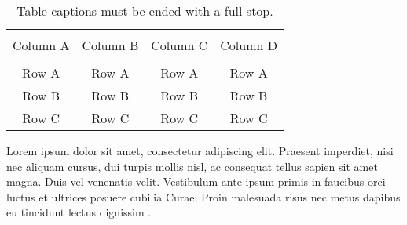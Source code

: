 \begin{table*}[htp!]
	{\setlength{\tabcolsep}{14pt}
		\caption{Table captions must be ended with a full stop.}
		\begin{center}
			\vspace{-6mm}
			\begin{tabular}{cccc}
				\hline \\[-2.45ex] \hline \\[-2.1ex]
				Column A & Column B & Column C & Column D \\
				\hline \\[-1.8ex]
				Row A & Row A & Row A & Row A \\
				Row B & Row B & Row B & Row B \\
				Row C & Row C & Row C & Row C \\
				\hline
			\end{tabular}
			\vspace{-6mm}
		\end{center}
		\label{Table1.1}}
\end{table*}

Lorem ipsum dolor sit amet, consectetur adipiscing elit. Praesent imperdiet, nisi nec aliquam cursus, dui turpis mollis nisl, ac consequat tellus sapien sit amet magna. Duis vel venenatis velit. Vestibulum ante ipsum primis in faucibus orci luctus et ultrices posuere cubilia Curae; Proin malesuada risus nec metus dapibus eu tincidunt lectus dignissim \cite{1993JHyd..144..193B}.